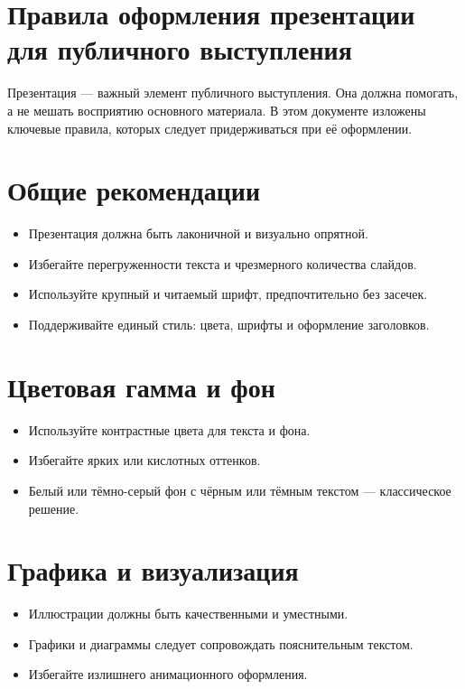 
\section{Правила оформления презентации для публичного выступления}

Презентация — важный элемент публичного выступления. Она должна помогать, а не мешать восприятию основного материала. В этом документе изложены ключевые правила, которых следует придерживаться при её оформлении.

\section*{Общие рекомендации}

\begin{itemize}
	\item Презентация должна быть лаконичной и визуально опрятной.
	\item Избегайте перегруженности текста и чрезмерного количества слайдов.
	\item Используйте крупный и читаемый шрифт, предпочтительно без засечек.
	\item Поддерживайте единый стиль: цвета, шрифты и оформление заголовков.
\end{itemize}

\section*{Цветовая гамма и фон}

\begin{itemize}
	\item Используйте контрастные цвета для текста и фона.
	\item Избегайте ярких или кислотных оттенков.
	\item Белый или тёмно-серый фон с чёрным или тёмным текстом — классическое решение.
\end{itemize}

\section*{Графика и визуализация}

\begin{itemize}
	\item Иллюстрации должны быть качественными и уместными.
	\item Графики и диаграммы следует сопровождать пояснительным текстом.
	\item Избегайте излишнего анимационного оформления.
\end{itemize}

